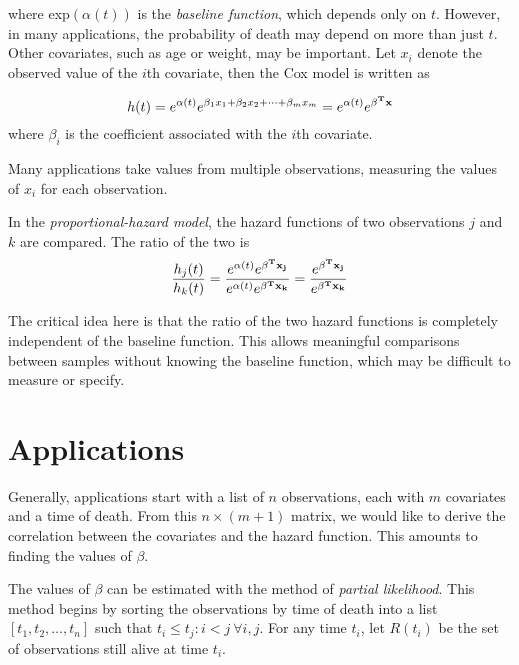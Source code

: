 where exp$(\alpha(t))$ is the \textit{baseline function}, which depends only on
$t$.  However, in many applications, the probability of death may depend on more
than just $t$.  Other covariates, such as age or weight, may be important.  Let
$x_i$ denote the observed value of the  $i$th covariate, then the Cox model is
written as

\begin{equation}
h(t) = e^{\alpha(t)} e^{\beta_1 x_1 + \beta_2 x_2 + \dots + \beta_m x_m} = e^{\alpha(t)} e^{\bold{\beta^T x}}
\end{equation}
where $\beta_i$ is the coefficient associated with the $i$th covariate.

Many applications take values from multiple observations, measuring the values
of $x_i$ for each observation.  %


In the \textit{proportional-hazard model}, the hazard functions of two
observations $j$ and $k$ are compared. The ratio of the two is
\begin{equation}
\frac{h_j(t)}{h_k(t)} = \frac{e^{\alpha(t)} e^{\bold{\beta^T x_j}} }{e^{\alpha(t)} e^{\bold{\beta^T x_k}} } = \frac{e^{\bold{\beta^T x_j} }}{ e^{\bold{\beta^T x_k}}}
\end{equation}

The critical idea here is that the ratio of the two hazard functions is
completely independent of the baseline function.  This allows meaningful
comparisons between samples without knowing the baseline function, which may be
difficult to measure or specify.

\section{Applications}\label{cox:Application}
Generally, applications start with a list of $n$ observations, each with $m$
covariates and a time of death.  From this $n \times (m+1)$ matrix, we would
like to derive the correlation between the covariates and the hazard function.
This amounts to finding the values of  $\beta$.

The values of $\beta$ can be estimated with the method of \textit{partial
likelihood}.  This method begins by sorting the observations by time of death
into a list $[t_1, t_2, \dots, t_n]$ such that $t_i \le t_j : i < j\ \forall
i,j$.  For any time $t_i$, let $R(t_i)$ be the set of observations still alive
at time $t_i$.

